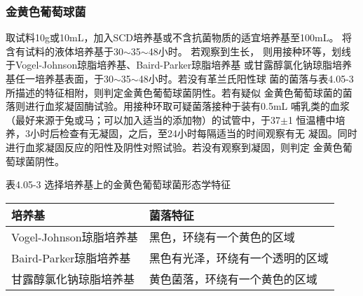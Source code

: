 \documentclass[11pt,a4paper]{article}
\newenvironment{SC}{%
  \CJKfamily{gbsn}%
  \CJKtilde
  \CJKnospace}{}
\begin{document}
\begin{CJK}{UTF8}{}
\begin{SC}
\subsubsection{金黄色葡萄球菌\endnote{}}
取试料10g或10mL，加入SCD培养基或不含抗菌物质的适宜培养基至100mL。
将含有试料的液体培养基于30$\sim$35$\sim$48小时。
若观察到生长，
则用接种环等，划线于Vogel-Johnson琼脂培养基、Baird-Parker琼脂培养基
或甘露醇氯化钠琼脂培养基任一培养基表面，于30$\sim$35$\sim$48小时。若没有革兰氏阳性球
菌的菌落与表4.05-3所描述的特征相附，则判定金黄色葡萄球菌阴性。若有疑似
金黄色葡萄球菌的菌落则进行血浆凝固酶试验\endnote{}。用接种环取可疑菌落接种于装有0.5mL
哺乳类的血浆（最好来源于兔或马；可以加入适当的添加物）的试管中，于37$\pm$1\textcelsius
恒温槽中培养，3小时后检查有无凝固，之后，至24小时每隔适当的时间观察有无
凝固。同时进行血浆凝固反应的阳性及阴性对照试验。若没有观察到凝固，则判定
金黄色葡萄球菌阴性。\\

\begin{table}[htb]
\begin{center}
表4.05-3 选择培养基上的金黄色葡萄球菌形态学特征\\
\begin{tabular}{l|l}
\hline
培养基&菌落特征\\
\hline
Vogel-Johnson琼脂培养基&黑色，环绕有一个黄色的区域\\
\hline
Baird-Parker琼脂培养基&黑色有光泽，环绕有一个透明的区域\\
\hline
甘露醇氯化钠琼脂培养基&黄色菌落，环绕有一个黄色的区域\\
\hline
\end{tabular}
\end{center}
\end{table}


\end{SC}
\end{CJK}
\end{document}
